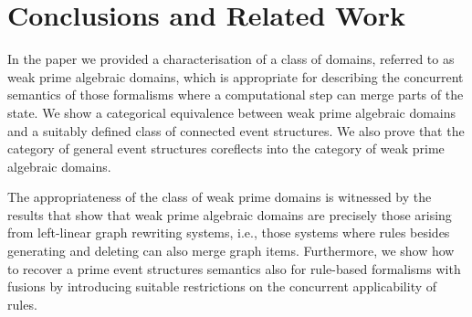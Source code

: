 




 
\section{Conclusions and Related Work}
\label{se:conc}

In the paper we provided a characterisation of a class of domains,
referred to as weak prime algebraic domains, which is appropriate for
describing the concurrent semantics of those formalisms where a
computational step can merge parts of the state. We show a
categorical equivalence between weak prime algebraic domains and a
suitably defined class of connected event structures. We also prove
that the category of general event structures coreflects into
the category of weak prime algebraic domains.

The appropriateness of
the class of weak prime domains is witnessed by the results 
that show that weak prime algebraic domains
are precisely those arising from left-linear graph rewriting systems,
i.e., those systems where rules besides generating and deleting can
also merge graph items.
%
Furthermore, we show how to recover 
a prime event structures semantics also for rule-based
formalisms with fusions by introducing suitable restrictions on the
concurrent applicability of rules.

